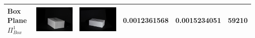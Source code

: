 \documentclass[final,12pt,3p]{elsarticle}
\begin{document}
\begin{table}[!ht]
{\begin{tabular}{| l | >{\centering\arraybackslash} m{2.5cm} | >{\centering\arraybackslash} m{2.5cm} | c | c | c |}
   Box Plane $\Pi_{Box}^{1}$ & \includegraphics[scale=0.05]{./images/box_cam1.JPG} & \includegraphics[scale=0.05]{./images/box_cam2.JPG} & 0.0012361568 & 0.0015234051 & 59210\\
   \hline

\end{tabular}}
\end{table}
\end{document}
